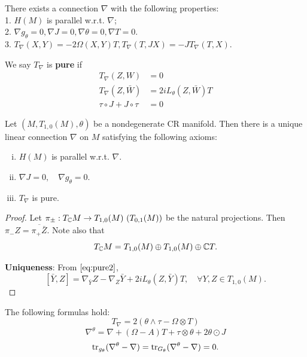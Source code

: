 \begin{theorem}
    There exists a connection $\nabla$ with the following properties:\\
    1. $H(M)$ is parallel w.r.t. $\nabla$;\\
    2. $\nabla g_{\theta}=0,\nabla J=0, \nabla \theta =0,\nabla T=0.$\\
    3. $T_{\nabla}(X,Y)=-2\Omega(X,Y)T, T_{\nabla}(T,JX)=-JT_{\nabla}(T,X)$.
\end{theorem}

\begin{remark}
    We say $T_{\nabla}$ is \textbf{pure} if
    \begin{align}
    T_{\nabla}(Z, W) & =0 \\
    T_{\nabla}(Z, \bar{W}) & =2 i L_{\theta}(Z, \bar{W}) T \label{eq:pure2}\\
    \tau \circ J+J \circ \tau & =0
    \end{align}
\end{remark}

\begin{theorem}
    Let $(M, T_{1,0}(M),\theta) $ be a nondegenerate CR manifold. Then there is a unique linear connection $ \nabla  $ on $M$ satisfying the following axioms:
    \begin{enumerate}[(i)]
        \item $H(M)$ is parallel w.r.t. $\nabla$.
        \item $ \nabla J =0,\quad \nabla g_{\theta }=0. $
        \item $ T_{\nabla } $ is pure.
    \end{enumerate}
\end{theorem}
\begin{proof}
    Let $ \pi _{\pm}: T_{{\mathbb C}}M \to T_{1,0}(M)~ (T_{0,1}(M)) $ be the natural projections. Then $ \pi _{-}Z=\overline{\pi _{+} \bar{Z} }$. Note also that 
    $$ T_{{\mathbb C}}M=T_{1,0}(M) \oplus T_{1,0}(M) \oplus {\mathbb C} T.$$

    \textbf{Uniqueness}: From $ \eqref{eq:pure2} $, 
    $$ [\bar{Y}, Z]=\nabla_{\bar{Y}} Z-\nabla_Z \bar{Y}+2 i L_\theta(Z, \bar{Y}) T, \quad \forall Y,Z \in T_{1,0}(M) .$$

\end{proof}

\begin{proposition}\label{pr:connection}
    The following formulas hold:
   $$ \boxed{T_{\nabla }=2(\theta  \wedge \tau -\Omega \otimes  T) }$$ 
   $$ \boxed{\nabla ^{\theta }=\nabla +(\Omega -A)T+\tau  \otimes \theta +2 \theta \odot  J }$$
   $$ \operatorname{tr}_{g_{\theta }}(\nabla ^{\theta }-\nabla )=\operatorname{tr}_{G_{\theta }}(\nabla ^{\theta }-\nabla )=0. $$
\end{proposition}


